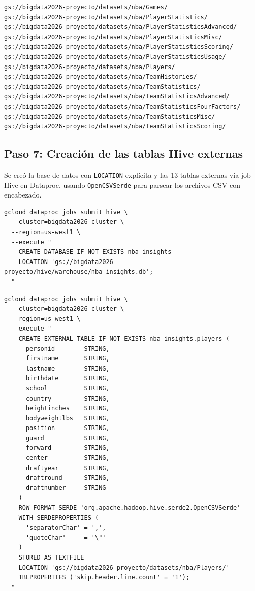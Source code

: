 \documentclass[12pt, letterpaper]{article}
\begin{document}
\begin{lstlisting}[style=outputstyle, caption={Evidencia --- 13 carpetas confirmadas via \texttt{gsutil ls}}]
gs://bigdata2026-proyecto/datasets/nba/Games/
gs://bigdata2026-proyecto/datasets/nba/PlayerStatistics/
gs://bigdata2026-proyecto/datasets/nba/PlayerStatisticsAdvanced/
gs://bigdata2026-proyecto/datasets/nba/PlayerStatisticsMisc/
gs://bigdata2026-proyecto/datasets/nba/PlayerStatisticsScoring/
gs://bigdata2026-proyecto/datasets/nba/PlayerStatisticsUsage/
gs://bigdata2026-proyecto/datasets/nba/Players/
gs://bigdata2026-proyecto/datasets/nba/TeamHistories/
gs://bigdata2026-proyecto/datasets/nba/TeamStatistics/
gs://bigdata2026-proyecto/datasets/nba/TeamStatisticsAdvanced/
gs://bigdata2026-proyecto/datasets/nba/TeamStatisticsFourFactors/
gs://bigdata2026-proyecto/datasets/nba/TeamStatisticsMisc/
gs://bigdata2026-proyecto/datasets/nba/TeamStatisticsScoring/
\end{lstlisting}

\subsection{Paso 7: Creación de las tablas Hive externas}

Se creó la base de datos con \texttt{LOCATION} explícita y las 13 tablas externas via job Hive en Dataproc, usando \texttt{OpenCSVSerde} para parsear los archivos CSV con encabezado.

\begin{lstlisting}[style=codestyle, caption={Creación de la base de datos \texttt{nba\_insights} con location explícita}]
gcloud dataproc jobs submit hive \
  --cluster=bigdata2026-cluster \
  --region=us-west1 \
  --execute "
    CREATE DATABASE IF NOT EXISTS nba_insights
    LOCATION 'gs://bigdata2026-proyecto/hive/warehouse/nba_insights.db';
  "
\end{lstlisting}

\begin{lstlisting}[style=codestyle, caption={Creación de la tabla externa \texttt{players} (patrón replicado para las 13 tablas)}]
gcloud dataproc jobs submit hive \
  --cluster=bigdata2026-cluster \
  --region=us-west1 \
  --execute "
    CREATE EXTERNAL TABLE IF NOT EXISTS nba_insights.players (
      personid        STRING,
      firstname       STRING,
      lastname        STRING,
      birthdate       STRING,
      school          STRING,
      country         STRING,
      heightinches    STRING,
      bodyweightlbs   STRING,
      position        STRING,
      guard           STRING,
      forward         STRING,
      center          STRING,
      draftyear       STRING,
      draftround      STRING,
      draftnumber     STRING
    )
    ROW FORMAT SERDE 'org.apache.hadoop.hive.serde2.OpenCSVSerde'
    WITH SERDEPROPERTIES (
      'separatorChar' = ',',
      'quoteChar'     = '\"'
    )
    STORED AS TEXTFILE
    LOCATION 'gs://bigdata2026-proyecto/datasets/nba/Players/'
    TBLPROPERTIES ('skip.header.line.count' = '1');
  "
\end{lstlisting}
\end{document}
